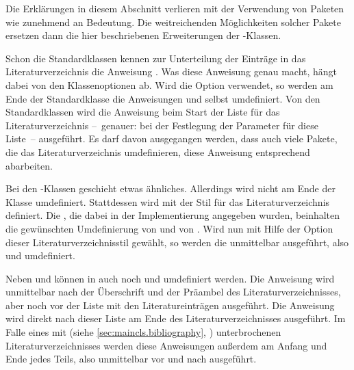 Die Erklärungen in diesem Abschnitt verlieren mit der Verwendung von Paketen
wie  zunehmend an Bedeutung. Die weitreichenden
Möglichkeiten solcher Pakete ersetzen dann die hier beschriebenen
Erweiterungen der \KOMAScript-Klassen.

\begin{Declaration}
\end{Declaration}
Schon die Standardklassen kennen zur Unterteilung
der Einträge in das Literaturverzeichnis die Anweisung . Was
diese Anweisung genau macht, hängt dabei von den Klassenoptionen ab. Wird die
Option  verwendet, so werden am
Ende der Standardklasse die Anweisungen  und
 selbst umdefiniert. Von den Standardklassen wird die
Anweisung  beim Start der Liste für das
Literaturverzeichnis --~genauer: bei der Festlegung der Parameter für diese
Liste~-- ausgeführt. Es darf davon ausgegangen werden, dass auch viele Pakete,
die das Literaturverzeichnis umdefinieren, diese Anweisung entsprechend
abarbeiten.

Bei den \KOMAScript-Klassen\textnote{\KOMAScript} geschieht etwas
ähnliches. Allerdings wird  nicht am Ende der Klasse
umdefiniert. Stattdessen wird mit  der Stil
 für das Literaturverzeichnis definiert. Die
, die dabei in der Implementierung angegeben wurden,
beinhalten die gewünschten Umdefinierung von  und von
. Wird nun mit Hilfe der Option
%
%
 dieser
Literaturverzeichnisstil gewählt, so werden die 
unmittelbar ausgeführt, also  und 
umdefiniert.

Neben  und  können in 
auch noch  und  umdefiniert
werden. Die Anweisung  wird unmittelbar nach der
Überschrift und der Präambel des Literaturverzeichnisses, aber noch vor der
Liste mit den Literatureinträgen ausgeführt. Die Anweisung 
wird direkt nach dieser Liste am Ende des Literaturverzeichnisses
ausgeführt. Im Falle eines mit  (siehe
\autoref{sec:maincls.bibliography},
) unterbrochenen
Literaturverzeichnisses werden diese Anweisungen außerdem am Anfang und Ende
jedes Teils, also unmittelbar vor und nach
 ausgeführt.

